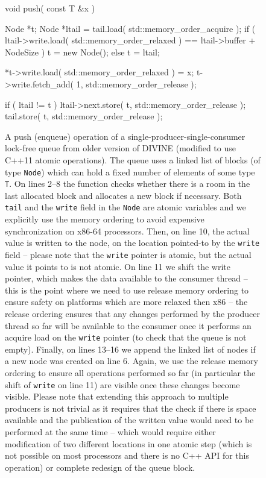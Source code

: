 \begin{figure}[tp]
  \begin{cppcodeln}
    void push( const T &x ) {
        Node *t;
        Node *ltail = tail.load( std::memory_order_acquire );
        if ( ltail->write.load( std::memory_order_relaxed )
                == ltail->buffer + NodeSize )
            t = new Node();
        else
            t = ltail;

        *t->write.load( std::memory_order_relaxed ) = x;
        t->write.fetch_add( 1, std::memory_order_release );

        if ( ltail != t ) {
            ltail->next.store( t, std::memory_order_release );
            tail.store( t, std::memory_order_release );
        }
    }
  \end{cppcodeln}
  \caption{A push (enqueue) operation of a single-producer-single-consumer
    lock-free queue from older version of DIVINE (modified to use C++11 atomic
    operations).
    The queue uses a linked list of blocks (of type \texttt{Node}) which can
    hold a fixed number of elements of some type \texttt{T}.
    On lines 2--8 the function checks whether there is a room in the last
    allocated block and allocates a new block if necessary.
    Both \texttt{tail} and the \texttt{write} field in the \texttt{Node} are
    atomic variables and we explicitly use the memory ordering to avoid
    expensive synchronization on x86-64 processors.
    Then, on line 10, the actual value is written to the node, on the location
    pointed-to by the \texttt{write} field -- please note that the
    \texttt{write} pointer is atomic, but the actual value it points to is not
    atomic.
    On line 11 we shift the write pointer, which makes the data available to
    the consumer thread -- this is the point where we need to use release
    memory ordering to ensure safety on platforms which are more relaxed then
    x86 -- the release ordering ensures that any changes performed by the
    producer thread so far will be available to the consumer once it performs
    an acquire load on the \texttt{write} pointer (to check that the queue is
    not empty).
    Finally, on lines 13--16 we append the linked list of nodes if a new node
    was created on line 6.
    Again, we use the release memory ordering to ensure all operations
    performed so far (in particular the shift of \texttt{write} on line 11) are
    visible once these changes become visible.
    Please note that extending this approach to multiple producers is not
    trivial as it requires that the check if there is space available and the
    publication of the written value would need to be performed at the same
    time -- which would require either modification of two different locations
    in one atomic step (which is not possible on most processors and there is
    no C++ API for this operation) or complete redesign of the queue block.
  }\label{fig:prelim:lockfree}
\end{figure}

